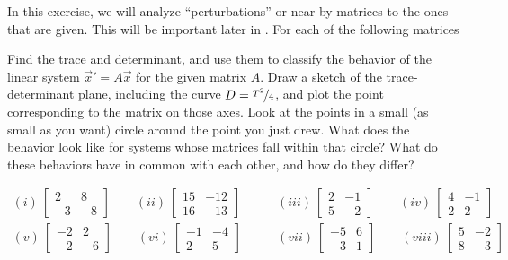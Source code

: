 \documentclass{ximera}
\begin{document}
\begin{exercise}
    In this exercise, we will analyze ``perturbations'' or near-by matrices to the ones that are given. This will be important later in . For each of the following matrices
    \begin{tasks}
        \task Find the trace and determinant, and use them to classify the behavior of the linear system ${\vec{x}}' = A\vec{x}$ for the given matrix $A$.
        \task Draw a sketch of the trace-determinant plane, including the curve $D = \nicefrac{T^2}{4}$, and plot the point corresponding to the matrix on those axes.
        \task Look at the points in a small (as small as you want) circle around the point you just drew. What does the behavior look like for systems whose matrices fall within that circle? What do these behaviors have in common with each other, and how do they differ?
    \end{tasks}
    \begin{equation*}
    \begin{split}
        (i)\ \begin{bmatrix} 2 & 8 \\ -3 & -8 \end{bmatrix} \qquad (ii)\ \begin{bmatrix} 15 & -12 \\ 16 & -13 \end{bmatrix} \qquad &(iii)\ \begin{bmatrix} 2 & -1 \\ 5 & -2 \end{bmatrix} \qquad (iv)\ \begin{bmatrix} 4 & -1 \\ 2 & 2 \end{bmatrix}\\
        (v)\ \begin{bmatrix} -2 & 2 \\ -2 & -6 \end{bmatrix} \qquad (vi)\ \begin{bmatrix} -1 & -4 \\ 2 & 5 \end{bmatrix} \qquad &(vii)\ \begin{bmatrix} -5 & 6 \\ -3 & 1 \end{bmatrix} \qquad (viii)\ \begin{bmatrix} 5 & -2 \\ 8 & -3 \end{bmatrix} 
    \end{split}
    \end{equation*}
\end{exercise}
\end{document}
